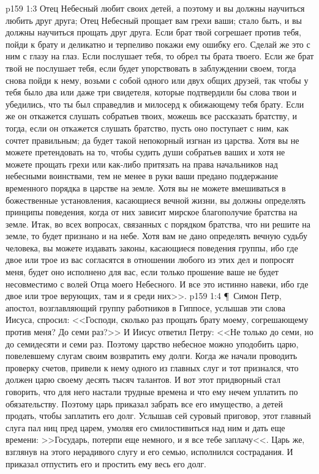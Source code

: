 \vs p159 1:3 Отец Небесный любит своих детей, а поэтому и вы должны научиться любить друг друга; Отец Небесный прощает вам грехи ваши; стало быть, и вы должны научиться прощать друг друга. Если брат твой согрешает против тебя, пойди к брату и деликатно и терпеливо покажи ему ошибку его. Сделай же это с ним с глазу на глаз. Если послушает тебя, то обрел ты брата твоего. Если же брат твой не послушает тебя, если будет упорствовать в заблуждении своем, тогда снова пойди к нему, возьми с собой одного или двух общих друзей, так чтобы у тебя было два или даже три свидетеля, которые подтвердили бы слова твои и убедились, что ты был справедлив и милосерд к обижающему тебя брату. Если же он откажется слушать собратьев твоих, можешь все рассказать братству, и тогда, если он откажется слушать братство, пусть оно поступает с ним, как сочтет правильным; да будет такой непокорный изгнан из царства. Хотя вы не можете претендовать на то, чтобы судить души собратьев ваших и хотя не можете прощать грехи или как\hyp{}либо притязать на права начальников над небесными воинствами, тем не менее в руки ваши предано поддержание временного порядка в царстве на земле. Хотя вы не можете вмешиваться в божественные установления, касающиеся вечной жизни, вы должны определять принципы поведения, когда от них зависит мирское благополучие братства на земле. Итак, во всех вопросах, связанных с порядком братства, что ни решите на земле, то будет признано и на небе. Хотя вам не дано определять вечную судьбу человека, вы можете издавать законы, касающиеся поведения группы, ибо где двое или трое из вас согласятся в отношении любого из этих дел и попросят меня, будет оно исполнено для вас, если только прошение ваше не будет несовместимо с волей Отца моего Небесного. И все это истинно навеки, ибо где двое или трое верующих, там и я среди них>>.
\vs p159 1:4 \P\ Симон Петр, апостол, возглавляющий группу работников в Гиппосе, услышав эти слова Иисуса, спросил: <<Господи, сколько раз прощать брату моему, согрешающему против меня? До семи раз?>> И Иисус ответил Петру: <<Не только до семи, но до семидесяти и семи раз. Поэтому царство небесное можно уподобить царю, повелевшему слугам своим возвратить ему долги. Когда же начали проводить проверку счетов, привели к нему одного из главных слуг и тот признался, что должен царю своему десять тысяч талантов. И вот этот придворный стал говорить, что для него настали трудные времена и что ему нечем уплатить по обязательству. Поэтому царь приказал забрать все его имущество, а детей продать, чтобы заплатить его долг. Услышав сей суровый приговор, этот главный слуга пал ниц пред царем, умоляя его смилостивиться над ним и дать еще времени: >>Государь, потерпи еще немного, и я все тебе заплачу<<. Царь же, взглянув на этого нерадивого слугу и его семью, исполнился сострадания. И приказал отпустить его и простить ему весь его долг.
